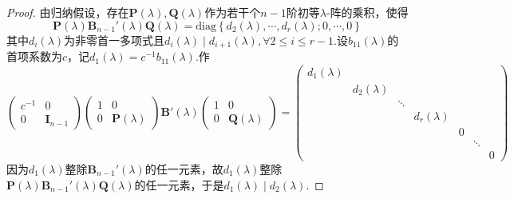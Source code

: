 {\begin{proof}
        由归纳假设，存在$\bm{P}\left(\lambda\right),\bm{Q}\left(\lambda\right)$作为若干个$n-1$阶初等$\lambda$-阵的乘积，使得
        \[
            \bm{P}\left(\lambda\right)\bm{B}_{n-1}'\left(\lambda\right)\bm{Q}\left(\lambda\right)=\mathrm{diag}\left\{
            d_2\left(\lambda\right),\cdots,d_r\left(\lambda\right);0,\cdots,0
            \right\}
        \]
        其中$d_i\left(\lambda\right)$为非零首一多项式且$d_i\left(\lambda\right)\mid d_{i+1}\left(\lambda\right),\forall 2\leqslant i\leqslant r-1$.设$b_{11}\left(\lambda\right)$的首项系数为$c$，记$d_1\left(\lambda\right)=c^{-1}b_{11}\left(\lambda\right).$作
        \[
            \begin{pmatrix}
                c^{-1} & 0 \\0 & \bm{I}_{n-1}
            \end{pmatrix}\begin{pmatrix}
                1 & 0 \\0 & \bm{P}\left(\lambda\right)
            \end{pmatrix}\bm{B}'\left(\lambda\right)\begin{pmatrix}
                1 & 0 \\0 & \bm{Q}\left(\lambda\right)
            \end{pmatrix}=
            \begin{pmatrix}
                d_1\left(\lambda\right) &                         &        &                         &   &        &   \\
                                        & d_2\left(\lambda\right) &        &                         &   &        &   \\
                                        &                         & \ddots &                         &   &        &   \\
                                        &                         &        & d_r\left(\lambda\right) &   &        &   \\
                                        &                         &        &                         & 0 &        &   \\
                                        &                         &        &                         &   & \ddots &   \\
                                        &                         &        &                         &   &        & 0
            \end{pmatrix}
        \]因为$d_1\left(\lambda\right)$整除$\bm{B}_{n-1}'\left(\lambda\right)$的任一元素，故$d_1\left(\lambda\right)$整除$\bm{P}\left(\lambda\right)\bm{B}_{n-1}'\left(\lambda\right)\bm{Q}\left(\lambda\right)$的任一元素，于是$d_1\left(\lambda\right)\mid d_2\left(\lambda\right)$.
    \end{proof}
}
